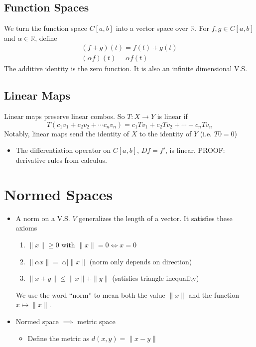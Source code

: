 \documentclass{article}
\newcommand{\R}{\mathbb{R}}
\theoremstyle{plain}
\theoremstyle{definition}
\begin{document}
		\subsection{Function Spaces}
		We turn the function space $C[a,b]$ into a vector space over $\R$. For $f,g\in C[a,b]$ and $\alpha\in \R$, define 
		\begin{align*}
				(f + g)(t) = f(t) + g(t) \\ 
				(\alpha f)(t) = \alpha f(t)
		\end{align*}
		The additive identity is the zero function. It is also an infinite dimensional V.S. 

		\subsection{Linear Maps}
		Linear maps preserve linear combos. So $T: X\to Y$ is linear if 
		\begin{equation*}
				T(c_1v_1 + c_2v_2 + \cdots c_nv_n) = c_1Tv_1 + c_2Tv_2 + \cdots + c_nTv_n
		\end{equation*}
		Notably, linear maps send the identity of $X$ to the identity of $Y$ (i.e. $T0 = 0$)
		\begin{itemize}
				\item The differentiation operator on $C[a,b]$, $Df = f'$, is linear. PROOF: derivative rules from calculus.
		\end{itemize}

		\section{Normed Spaces}
		\begin{itemize}
				\item A norm on a V.S. $V$ generalizes the length of a vector. It satisfies these axioms 
						\begin{enumerate}
								\item $\|x\| \geq 0$ with $\|x\| = 0 \Longleftrightarrow x = 0$
								\item $\|\alpha x\| = |\alpha| \|x\|$ (norm only depends on direction) 
								\item $\|x + y\| \leq \|x\| + \|y\|$ (satisfies triangle inequality)
						\end{enumerate}
						We use the word ``norm'' to mean both the value $\|x\|$ and the function $x \mapsto \|x\|$. 

				\item Normed space $\implies$ metric space 
						\begin{itemize}
								\item Define the metric as $d(x,y) = \|x-y\|$
						\end{itemize}
		\end{itemize}
\end{document}
